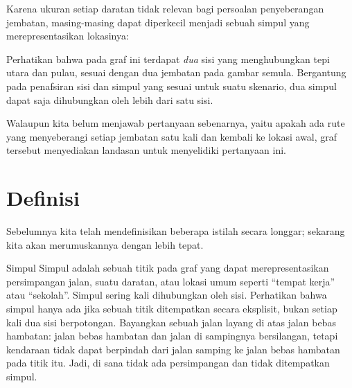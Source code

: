 \begin{example}{}
\begin{center}
\end{center}
Karena ukuran setiap daratan tidak relevan bagi persoalan penyeberangan jembatan, masing-masing dapat diperkecil menjadi sebuah simpul yang merepresentasikan lokasinya:
\begin{center}
\par{}\label{fig:graphtheory-dor1-tikz04}%

\end{center}

Perhatikan bahwa pada graf ini terdapat \textit{dua} sisi yang menghubungkan tepi utara dan pulau, sesuai dengan dua jembatan pada gambar semula.  Bergantung pada penafsiran sisi dan simpul yang sesuai untuk suatu skenario, dua simpul dapat saja dihubungkan oleh lebih dari satu sisi.

Walaupun kita belum menjawab pertanyaan sebenarnya, yaitu apakah ada rute yang menyeberangi setiap jembatan satu kali dan kembali ke lokasi awal, graf tersebut menyediakan landasan untuk menyelidiki pertanyaan ini.
 \end{example}

\section{Definisi}
Sebelumnya kita telah mendefinisikan beberapa istilah secara longgar; sekarang kita akan merumuskannya dengan lebih tepat.

\begin{definition}{Simpul}\label{def:vertex} 
Simpul adalah sebuah titik pada graf yang dapat merepresentasikan persimpangan jalan, suatu daratan, atau lokasi umum seperti “tempat kerja” atau “sekolah”.  Simpul sering kali dihubungkan oleh sisi.  Perhatikan bahwa simpul hanya ada jika sebuah titik ditempatkan secara eksplisit, bukan setiap kali dua sisi berpotongan.  Bayangkan sebuah jalan layang di atas jalan bebas hambatan: jalan bebas hambatan dan jalan di sampingnya bersilangan, tetapi kendaraan tidak dapat berpindah dari jalan samping ke jalan bebas hambatan pada titik itu. Jadi, di sana tidak ada persimpangan dan tidak ditempatkan simpul.
\end{definition}

